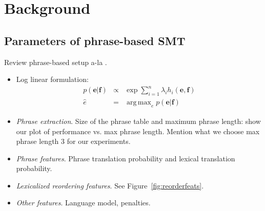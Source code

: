 \documentclass[11pt]{article}
\DeclareMathOperator*{\argmax}{arg\,max}
\newcommand{\figref}[1]{Figure~\ref{#1}}
\begin{document}

\section{Background} \label{sect:bckg}
\subsection{Parameters of phrase-based SMT} \label{sect:bckg:smt}

Review phrase-based setup a-la \cite{Koehn:2003}.

\begin{itemize}
\item Log linear formulation:
  \begin{eqnarray*}
    p(\mathbf{e} | \mathbf{f}) & \propto & \exp \sum_{i=1}^{n}{\lambda_i h_i (\mathbf{e}, \mathbf{f})} \label{log-linear-formulation}\\
    \hat{e} & = & \argmax_{e}{p(\mathbf{e} | \mathbf{f}) }
  \end{eqnarray*}

\item \emph{Phrase extraction}.  Size of the phrase table and maximum phrase length: show our plot of performance vs. max phrase length.  Mention what we choose max phrase length 3 for our experiments.

\item \emph{Phrase features}.  Phrase translation probability and lexical translation probability.

\item \emph{Lexicalized reordering features}.  See \figref{fig:reorderfeats}.

\item \emph{Other features}. Language model, penalties.

\end{itemize}
\end{document}
